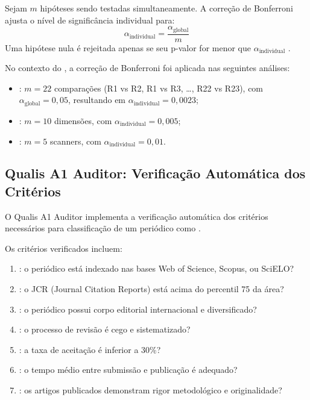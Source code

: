 \begin{definicao}
Sejam $m$ hipóteses sendo testadas simultaneamente. A correção de Bonferroni
ajusta o nível de significância individual para:
\begin{equation}
\alpha_{\text{individual}} = \frac{\alpha_{\text{global}}}{m}
\end{equation}
Uma hipótese nula é rejeitada apenas se seu p-valor for menor que
$\alpha_{\text{individual}}$ \cite{bonferroni1936teoria}.
\end{definicao}

No contexto do \opencodeeco{}, a correção de Bonferroni foi aplicada nas
seguintes análises:

\begin{itemize}
\item {}: $m = 22$ comparações
      (R1 vs R2, R1 vs R3, \dots, R22 vs R23), com $\alpha_{\text{global}} = 0,05$,
      resultando em $\alpha_{\text{individual}} = 0,0023$;
\item {}: $m = 10$ dimensões, com
      $\alpha_{\text{individual}} = 0,005$;
\item {}: $m = 5$ scanners, com
      $\alpha_{\text{individual}} = 0,01$.
\end{itemize}

\subsection{Qualis A1 Auditor: Verificação Automática dos Critérios}

O Qualis A1 Auditor implementa a verificação automática dos critérios
necessários para classificação de um periódico como \qualisA{}
\cite{laranjeira2026opencode, laranjeira2026gartner}.

Os critérios verificados incluem:

\begin{enumerate}
\item {}: o periódico está indexado nas bases Web of Science,
      Scopus, ou SciELO?
\item {}: o JCR (Journal Citation Reports) está acima
      do percentil 75 da área?
\item {}: o periódico possui corpo editorial
      internacional e diversificado?
\item {}: o processo de revisão é cego e
      sistematizado?
\item {}: a taxa de aceitação é inferior a 30\%?
\item {}: o tempo médio entre submissão e
      publicação é adequado?
\item {}: os artigos publicados demonstram rigor
      metodológico e originalidade?
\end{enumerate}

